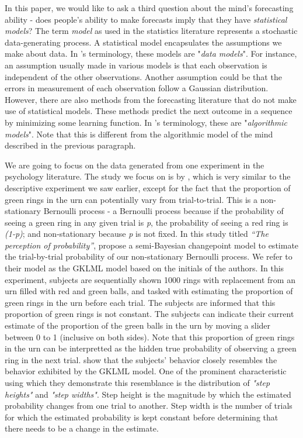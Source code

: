 \documentclass{article}
\begin{document}
In this paper, we would like to ask a third question about the mind's forecasting ability - does people's ability to make forecasts imply that they have \textit{statistical models}? The term \textit{model} as used in the statistics literature represents a stochastic data-generating process. A statistical model encapsulates the assumptions we make about data. In \cite{breiman2001statistical}'s terminology, these models are "\textit{data models}". For instance, an assumption usually made in various models is that each observation is independent of the other observations. Another assumption could be that the errors in measurement of each observation follow a Gaussian distribution. However, there are also methods from the forecasting literature that do not make use of statistical models. These methods predict the next outcome in a sequence by minimizing some learning function. In \cite{breiman2001statistical}'s terminology, these are "\textit{algorithmic models}". Note that this is different from the algorithmic model of the mind described in the previous paragraph.

We are going to focus on the data generated from one experiment in the psychology literature. The study we focus on is by \cite{gallistel2014perception}, which is very similar to the descriptive experiment we saw earlier, except for the fact that the proportion of green rings in the urn can potentially vary from trial-to-trial. This is a non-stationary Bernoulli process - a Bernoulli process because if the probability of seeing a green ring in any given trial is \textit{p}, the probability of seeing a red ring is \textit{(1-p)}; and non-stationary because \textit{p} is not fixed. In this study titled \textit{``The perception of probability''}, \cite{gallistel2014perception} propose a semi-Bayesian changepoint model to estimate the trial-by-trial probability of our non-stationary Bernoulli process. We refer to their model as the GKLML model based on the initials of the authors. In this experiment, subjects are sequentially shown 1000 rings with replacement from an urn filled with red and green balls, and tasked with estimating the proportion of green rings in the urn before each trial. The subjects are informed that this proportion of green rings is not constant. The subjects can indicate their current estimate of the proportion of the green balls in the urn by moving a slider between 0 to 1 (inclusive on both sides). Note that this proportion of green rings in the urn can be interpretted as the hidden true probability of observing a green ring in the next trial. \cite{gallistel2014perception} show that the subjects' behavior closely resembles the behavior exhibited by the GKLML model. One of the prominent characteristic using which they demonstrate this resemblance is the distribution of \textit{"step heights"} and \textit{"step widths"}. Step height is the magnitude by which the estimated probability changes from one trial to another. Step width is the number of trials for which the estimated probability is kept constant before determining that there needs to be a change in the estimate.
\end{document}
